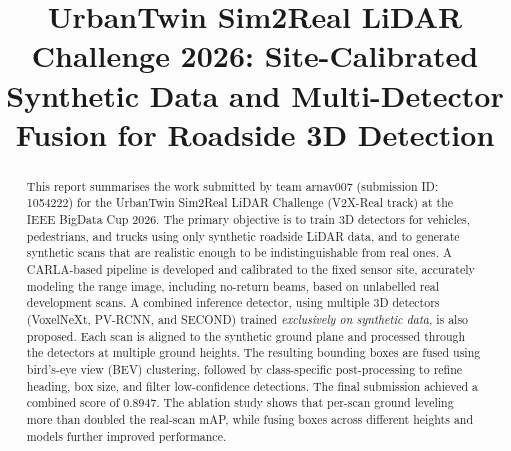 \documentclass[conference]{IEEEtran}
\begin{document}
\title{UrbanTwin Sim2Real LiDAR Challenge 2026: Site-Calibrated Synthetic Data and Multi-Detector Fusion for Roadside 3D Detection}


\author{
\and
{}
}

\maketitle
\thispagestyle{plain}
\pagestyle{plain}
\begin{abstract}
This report summarises the work submitted by team arnav007 (submission ID: 1054222) for the UrbanTwin Sim2Real LiDAR Challenge (V2X-Real track) at the IEEE BigData Cup 2026. The primary objective is to train 3D detectors for vehicles, pedestrians, and trucks using only synthetic roadside LiDAR data, and to generate synthetic scans that are realistic enough to be indistinguishable from real ones. A CARLA-based pipeline is  developed and calibrated to the fixed sensor site, accurately modeling the range image, including no-return beams, based on unlabelled real development scans. A combined inference detector, using multiple 3D detectors (VoxelNeXt, PV-RCNN, and SECOND) trained \textit{exclusively on synthetic data}, is also proposed. Each scan is aligned to the synthetic ground plane and processed through the detectors at multiple ground heights. The resulting bounding boxes are fused using  bird’s-eye view (BEV) clustering, followed by class-specific post-processing to refine heading, box size, and filter low-confidence detections. The final submission achieved a combined score of 0.8947. The ablation study shows that per-scan ground leveling more than doubled the real-scan mAP, while fusing boxes across different heights and models further improved performance.

\end{abstract}
\end{document}

